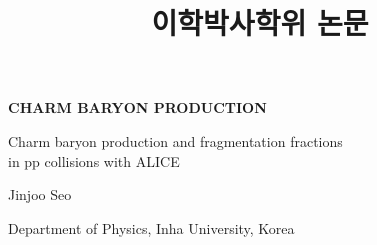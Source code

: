 


\title{이학박사학위 논문}
\maketitle

\rhead{\thepage}
\cfoot{}

{\footnotesize \tableofcontents{} \newpage{}} {\footnotesize \par}

\begin{singlespace}
{\small \listoffigures 
\newpage{}}{\small \par}

{\small \listoftables
}{\small \par}
\end{singlespace}

\newpage{}
\thispagestyle{empty}
\begin{singlespace}
\small \bf CHARM BARYON PRODUCTION
\end{singlespace}


\begin{center}
{Charm baryon production and fragmentation fractions\\in pp collisions with ALICE}\\
\vskip 0.8cm
\par\end{center}

\begin{center}
Jinjoo Seo{\Large }\\
\vskip 0.3cm
\par\end{center}

\begin{center}
Department of Physics, Inha University, Korea{\large }\\
\vskip 0.8cm
\par\end{center}

